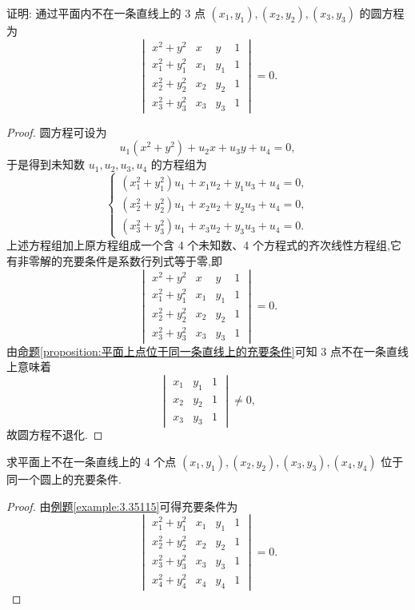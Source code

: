 \documentclass[../../main.tex]{subfiles}%
\begin{document}
\begin{example}\label{example:3.35115}
证明: 通过平面内不在一条直线上的 3 点 \((x_1,y_1),(x_2,y_2),(x_3,y_3)\) 的圆方程为
\[
\begin{vmatrix}
x^2 + y^2&x&y&1\\
x_1^2 + y_1^2&x_1&y_1&1\\
x_2^2 + y_2^2&x_2&y_2&1\\
x_3^2 + y_3^2&x_3&y_3&1
\end{vmatrix}=0.
\]
\end{example}
\begin{proof}

圆方程可设为
\[
u_1(x^2 + y^2)+u_2x + u_3y + u_4 = 0,
\]
于是得到未知数 \(u_1,u_2,u_3,u_4\) 的方程组为
\[
\begin{cases}
(x_1^2 + y_1^2)u_1 + x_1u_2 + y_1u_3 + u_4 = 0,\\
(x_2^2 + y_2^2)u_1 + x_2u_2 + y_2u_3 + u_4 = 0,\\
(x_3^2 + y_3^2)u_1 + x_3u_2 + y_3u_3 + u_4 = 0.
\end{cases}
\]
上述方程组加上原方程组成一个含 4 个未知数、4 个方程式的齐次线性方程组,它有非零解的充要条件是系数行列式等于零,即
\[
\begin{vmatrix}
x^2 + y^2&x&y&1\\
x_1^2 + y_1^2&x_1&y_1&1\\
x_2^2 + y_2^2&x_2&y_2&1\\
x_3^2 + y_3^2&x_3&y_3&1
\end{vmatrix}=0.
\]
由\hyperref[proposition:平面上点位于同一条直线上的充要条件]{命题\ref{proposition:平面上点位于同一条直线上的充要条件}}可知 3 点不在一条直线上意味着
\[
\begin{vmatrix}
x_1&y_1&1\\
x_2&y_2&1\\
x_3&y_3&1
\end{vmatrix}\neq0,
\]
故圆方程不退化.  

\end{proof}

\begin{proposition}\label{proposition:平面上4点共圆的充要条件}
求平面上不在一条直线上的 4 个点 \((x_1,y_1),(x_2,y_2),(x_3,y_3),(x_4,y_4)\) 位于同一个圆上的充要条件.
\end{proposition}
\begin{proof}

由\hyperref[example:3.35115]{例题\ref{example:3.35115}}可得充要条件为
\[
\begin{vmatrix}
x_1^2 + y_1^2&x_1&y_1&1\\
x_2^2 + y_2^2&x_2&y_2&1\\
x_3^2 + y_3^2&x_3&y_3&1\\
x_4^2 + y_4^2&x_4&y_4&1
\end{vmatrix}=0.
\]

\end{proof}
\end{document}
